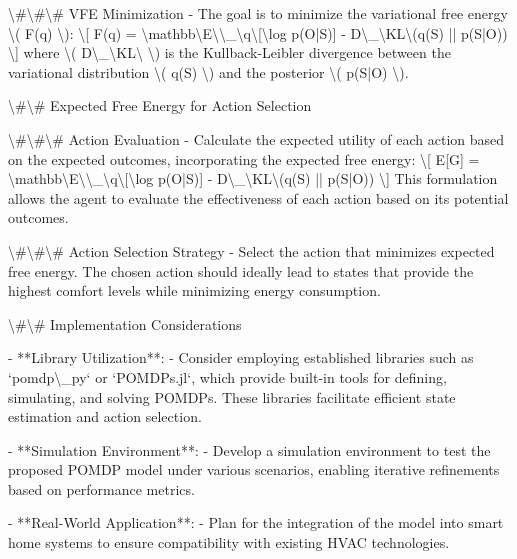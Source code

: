 \documentclass[11pt,a4paper]{article}
\begin{document}
\textbackslash{}#\textbackslash{}#\textbackslash{}# VFE Minimization
- The goal is to minimize the variational free energy \textbackslash{}( F(q) \textbackslash{}):
   \textbackslash{}[
   F(q) = \textbackslash{}mathbb\textbackslash{}{E\textbackslash{}}\textbackslash{}_\textbackslash{}{q\textbackslash{}}[\textbackslash{}log p(O|S)] - D\textbackslash{}_\textbackslash{}{KL\textbackslash{}}(q(S) || p(S|O))
   \textbackslash{}]
   where \textbackslash{}( D\textbackslash{}_\textbackslash{}{KL\textbackslash{}} \textbackslash{}) is the Kullback-Leibler divergence between the variational distribution \textbackslash{}( q(S) \textbackslash{}) and the posterior \textbackslash{}( p(S|O) \textbackslash{}).

\textbackslash{}#\textbackslash{}# Expected Free Energy for Action Selection

\textbackslash{}#\textbackslash{}#\textbackslash{}# Action Evaluation
- Calculate the expected utility of each action based on the expected outcomes, incorporating the expected free energy:
   \textbackslash{}[
   E[G] = \textbackslash{}mathbb\textbackslash{}{E\textbackslash{}}\textbackslash{}_\textbackslash{}{q\textbackslash{}}[\textbackslash{}log p(O|S)] - D\textbackslash{}_\textbackslash{}{KL\textbackslash{}}(q(S) || p(S|O))
   \textbackslash{}]
   This formulation allows the agent to evaluate the effectiveness of each action based on its potential outcomes.

\textbackslash{}#\textbackslash{}#\textbackslash{}# Action Selection Strategy
- Select the action that minimizes expected free energy. The chosen action should ideally lead to states that provide the highest comfort levels while minimizing energy consumption.

\textbackslash{}#\textbackslash{}# Implementation Considerations

- **Library Utilization**: 
   - Consider employing established libraries such as `pomdp\textbackslash{}_py` or `POMDPs.jl`, which provide built-in tools for defining, simulating, and solving POMDPs. These libraries facilitate efficient state estimation and action selection.

- **Simulation Environment**: 
   - Develop a simulation environment to test the proposed POMDP model under various scenarios, enabling iterative refinements based on performance metrics.

- **Real-World Application**: 
   - Plan for the integration of the model into smart home systems to ensure compatibility with existing HVAC technologies.
\end{document}
